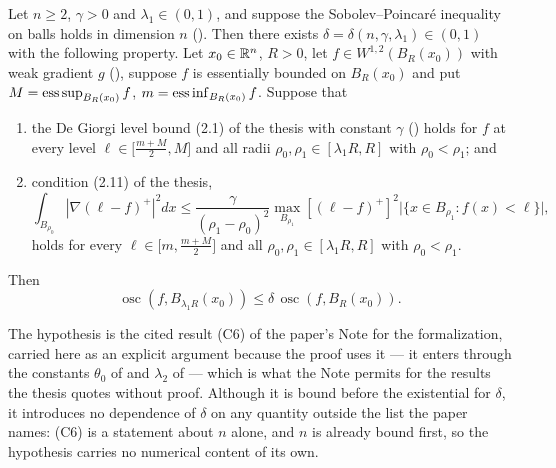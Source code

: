 \begin{lemma}[Lemma 2.5]
Let $n\ge2$, $\gamma>0$ and $\lambda_1\in(0,1)$, and suppose the Sobolev--Poincar\'e inequality on balls holds in dimension $n$
().  Then there exists
$\delta=\delta(n,\gamma,\lambda_1)\in(0,1)$ with the following property.  Let
$x_0\in\mathbb{R}^n$, $R>0$, let $f\in W^{1,2}(B_R(x_0))$ with weak gradient $g$
(), suppose $f$ is essentially bounded on $B_R(x_0)$ and put
$M=\operatorname*{ess\,sup}_{B_R(x_0)}f$, $m=\operatorname*{ess\,inf}_{B_R(x_0)}f$.  Suppose that
\begin{enumerate}
\item the De Giorgi level bound (2.1) of the thesis with constant $\gamma$
  () holds for $f$ at every level
  $\ell\in\bigl[\frac{m+M}2,M\bigr]$ and all radii
  $\rho_0,\rho_1\in[\lambda_1R,R]$ with $\rho_0<\rho_1$; and
\item condition (2.11) of the thesis,
\[
\int_{B_{\rho_0}}|\nabla(\ell-f)^+|^2dx\le\frac{\gamma}{(\rho_1-\rho_0)^2}
\max_{B_{\rho_1}}[(\ell-f)^+]^2\bigl|\{x\in B_{\rho_1}:f(x)<\ell\}\bigr| ,
\]
holds for every $\ell\in\bigl[m,\frac{m+M}2\bigr]$ and all
$\rho_0,\rho_1\in[\lambda_1R,R]$ with $\rho_0<\rho_1$.
\end{enumerate}
Then
\[
\operatorname*{osc}(f,B_{\lambda_1R}(x_0))\le\delta\,\operatorname*{osc}(f,B_R(x_0)) .
\]

The hypothesis  is the cited result (C6) of the
paper's Note for the formalization, carried here as an explicit argument because
the proof uses it --- it enters through the constants $\theta_0$ of  and $\lambda_2$ of  --- which is what the
Note permits for the results the thesis quotes without proof.  Although it is
bound before the existential for $\delta$, it introduces no dependence of
$\delta$ on any quantity outside the list the paper names: (C6) is a statement
about $n$ alone, and $n$ is already bound first, so the hypothesis carries no
numerical content of its own.
\end{lemma}
